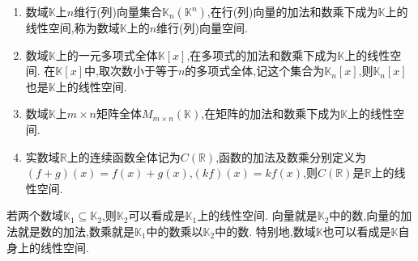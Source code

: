 \documentclass[lang=cn,newtx,10pt,scheme=chinese]{elegantbook}
\begin{document}
\begin{example}[$\,\,$常见的线性空间]\label{example:常见的线性空间}
\begin{enumerate}[(1)]
\item 数域\(\mathbb{K}\)上\(n\)维行(列)向量集合\(\mathbb{K}_n(\mathbb{K}^n)\),在行(列)向量的加法和数乘下成为\(\mathbb{K}\)上的线性空间,称为数域\(\mathbb{K}\)上的\(n\)维行(列)向量空间.
\item 数域\(\mathbb{K}\)上的一元多项式全体\(\mathbb{K}[x]\),在多项式的加法和数乘下成为\(\mathbb{K}\)上的线性空间. 在\(\mathbb{K}[x]\)中,取次数小于等于\(n\)的多项式全体,记这个集合为\(\mathbb{K}_n[x]\),则\(\mathbb{K}_n[x]\)也是\(\mathbb{K}\)上的线性空间.
\item 数域\(\mathbb{K}\)上\(m\times n\)矩阵全体\(M_{m\times n}(\mathbb{K})\),在矩阵的加法和数乘下成为\(\mathbb{K}\)上的线性空间.
\item \label{example:常见的线性空间(4)}实数域\(\mathbb{R}\)上的连续函数全体记为\(C(\mathbb{R})\),函数的加法及数乘分别定义为\((f + g)(x)=f(x)+g(x)\),\((kf)(x)=kf(x)\),则\(C(\mathbb{R})\)是\(\mathbb{R}\)上的线性空间.
\end{enumerate}
\end{example}

\begin{proposition}\label{proposition:数域上的线性空间}
若两个数域\(\mathbb{K}_1\subseteq\mathbb{K}_2\),则\(\mathbb{K}_2\)可以看成是\(\mathbb{K}_1\)上的线性空间. 向量就是\(\mathbb{K}_2\)中的数,向量的加法就是数的加法,数乘就是\(\mathbb{K}_1\)中的数乘以\(\mathbb{K}_2\)中的数. 特别地,数域\(\mathbb{K}\)也可以看成是\(\mathbb{K}\)自身上的线性空间.
\end{proposition}
\end{document}
